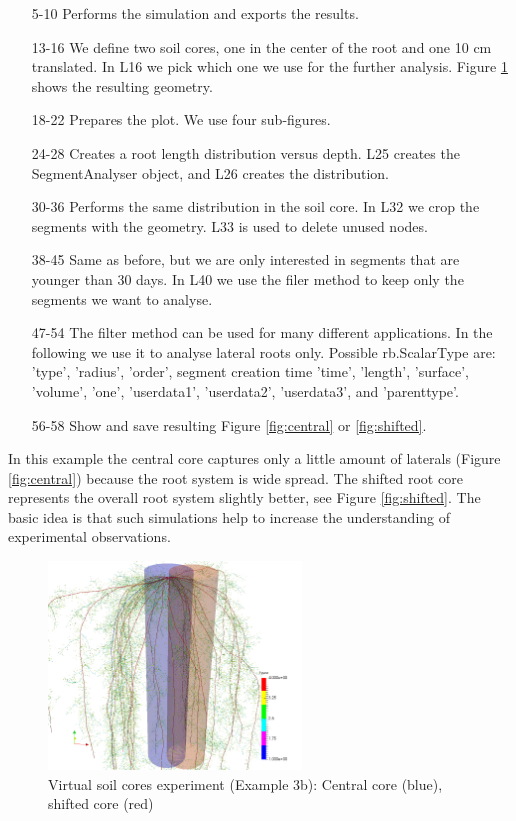 \documentclass[a4paper]{article}
\begin{document}
\begin{itemize}

\item[5-10] Performs the simulation and exports the results.

\item[13-16] We define two soil cores, one in the center of the root and one 10 cm translated. In L16 we pick which one we use for the further analysis.  Figure \ref{fig:soilcoreGeom} shows the resulting geometry.

\item[18-22] Prepares the plot. We use four sub-figures. 

\item[24-28] Creates a root length distribution versus depth. L25 creates the SegmentAnalyser object, and L26 creates the distribution.

\item[30-36] Performs the same distribution in the soil core. In L32 we crop the segments with the geometry. L33 is used to delete unused nodes. 

\item[38-45] Same as before, but we are only interested in segments that are younger than 30 days. In L40 we use the filer method to keep only the segments we want to analyse. 

\item[47-54] The filter method can be used for many different applications. In the following we use it to analyse lateral roots only. Possible rb.ScalarType are: 
'type', 'radius', 'order', segment creation time 'time', 'length', 'surface', 'volume', 'one', 'userdata1', 'userdata2', 'userdata3', and 'parenttype'.
\item[56-58] Show and save resulting Figure \ref{fig:central} or \ref{fig:shifted}.

\end{itemize}

In this example the central core captures only a little amount of laterals (Figure \ref{fig:central}) because the root system is wide spread. 
The shifted root core represents the overall root system slightly better, see Figure \ref{fig:shifted}.  
The basic idea is that such simulations help to increase the understanding of experimental observations.

\begin{figure}
\centering
\includegraphics[width=0.6\textwidth]{example_3b.png}
\caption{Virtual soil cores experiment (Example 3b): Central core (blue), shifted core (red)} \label{fig:soilcoreGeom}
\end{figure} 
\end{document}
